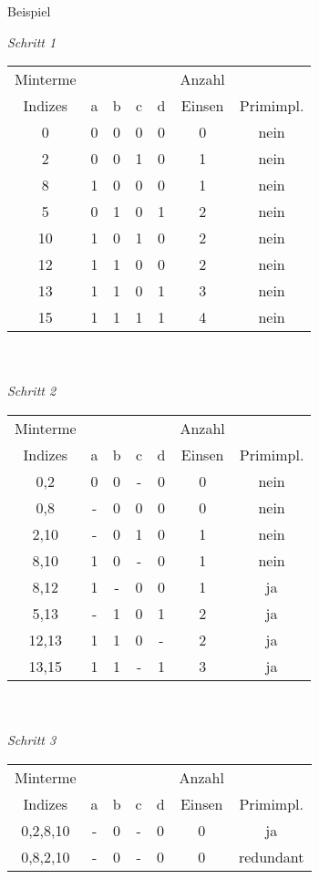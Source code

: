 \documentclass[german, 10pt, a4paper, twocolumn]{scrartcl}
\theoremstyle{definition}
\begin{document}
\begin{labeling}{Beispiel}
	\item[\usekomafont{descriptionlabel}Beispiel]\textit{Schritt 1}\\
		\small
		\begin{tabular}{ccccccc}
			Minterme &	&	&	&	&	Anzahl &	\\
			Indizes &	a &	b &	c&	d&	Einsen &	Primimpl.\\ \hline
			0 &		0 &	0 &	0&	0&	0&		nein\\ \hline

			2 &		0 &	0 &	1&	0&	1&		nein\\
			8 &		1 &	0 &	0&	0&	1&		nein\\ \hline

			5 &		0 &	1 &	0&	1&	2&		nein\\ 
			10 &		1 &	0 &	1&	0&	2&		nein\\ 
			12 &		1 &	1 &	0&	0&	2&		nein\\ \hline

			13 &		1 &	1 &	0&	1&	3&		nein\\ \hline
			
			15 &		1 &	1 &	1&	1&	4&		nein\\ \hline
		\end{tabular}
		\normalsize
		\\\\
		\textit{Schritt 2}\\
		\small
		\begin{tabular}{ccccccc}
			Minterme &	&	&	&	&	Anzahl &	\\
			Indizes &	a &	b &	c&	d&	Einsen &	Primimpl.\\ \hline
			0,2 &		0 &	0 &	-&	0&	0&		nein\\ 
			0,8 &		- &	0 &	0&	0&	0&		nein\\ \hline

			2,10 &		- &	0 &	1&	0&	1&		nein\\
			8,10 &		1 &	0 &	-&	0&	1&		nein\\
			8,12 &		1 &	- &	0&	0&	1&		ja\\ \hline

			5,13 &		- &	1 &	0&	1&	2&		ja\\
			12,13 &		1 &	1 &	0&	-&	2&		ja\\ \hline

			13,15 &		1 &	1 &	-&	1&	3&		ja\\ \hline
		\end{tabular}
		\normalsize
		\\\\
		\textit{Schritt 3}\\
		\small
		\begin{tabular}{ccccccc}
			Minterme &	&	&	&	&	Anzahl &	\\
			Indizes &	a &	b &	c&	d&	Einsen &	Primimpl.\\ \hline
			0,2,8,10 &	- &	0 &	-&	0&	0&		ja\\ 
			0,8,2,10 &	- &	0 &	-&	0&	0&		redundant\\ 
		\end{tabular}
		\normalsize
\end{labeling}
\end{document}
